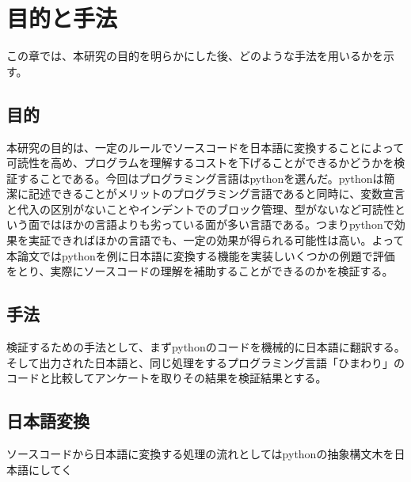 \chapter{目的と手法}
\label{chap:design}

この章では、本研究の目的を明らかにした後、どのような手法を用いるかを示す。

\section{目的}

本研究の目的は、一定のルールでソースコードを日本語に変換することによって可読性を高め、プログラムを理解するコストを下げることができるかどうかを検証することである。今回はプログラミング言語はpythonを選んだ。pythonは簡潔に記述できることがメリットのプログラミング言語であると同時に、変数宣言と代入の区別がないことやインデントでのブロック管理、型がないなど可読性という面ではほかの言語よりも劣っている面が多い言語である。つまりpythonで効果を実証できればほかの言語でも、一定の効果が得られる可能性は高い。よって本論文ではpythonを例に日本語に変換する機能を実装しいくつかの例題で評価をとり、実際にソースコードの理解を補助することができるのかを検証する。

\section{手法}

検証するための手法として、まずpythonのコードを機械的に日本語に翻訳する。そして出力された日本語と、同じ処理をするプログラミング言語「ひまわり」のコードと比較してアンケートを取りその結果を検証結果とする。

\section{日本語変換}

ソースコードから日本語に変換する処理の流れとしてはpythonの抽象構文木を日本語にしてく